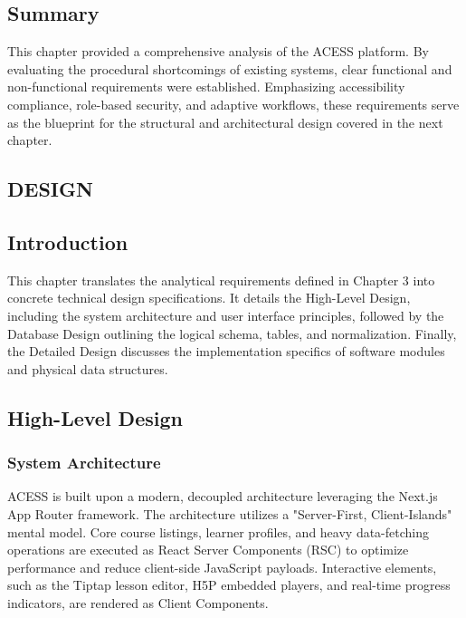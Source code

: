\documentclass[12pt,a4paper]{report}
\begin{document}
\subsection{Summary}
This chapter provided a comprehensive analysis of the ACESS platform. By evaluating the procedural shortcomings of existing systems, clear functional and non-functional requirements were established. Emphasizing accessibility compliance, role-based security, and adaptive workflows, these requirements serve as the blueprint for the structural and architectural design covered in the next chapter.

\vfill \null
\newpage

\vfill \null
\thispagestyle{empty}
\begin{center}
\section{DESIGN}
\end{center}
\vspace{2cm}

\subsection{Introduction}
This chapter translates the analytical requirements defined in Chapter 3 into concrete technical design specifications. It details the High-Level Design, including the system architecture and user interface principles, followed by the Database Design outlining the logical schema, tables, and normalization. Finally, the Detailed Design discusses the implementation specifics of software modules and physical data structures.

\subsection{High-Level Design}

\subsubsection{System Architecture}
ACESS is built upon a modern, decoupled architecture leveraging the Next.js App Router framework. The architecture utilizes a "Server-First, Client-Islands" mental model. Core course listings, learner profiles, and heavy data-fetching operations are executed as React Server Components (RSC) to optimize performance and reduce client-side JavaScript payloads. Interactive elements, such as the Tiptap lesson editor, H5P embedded players, and real-time progress indicators, are rendered as Client Components.
\end{document}
